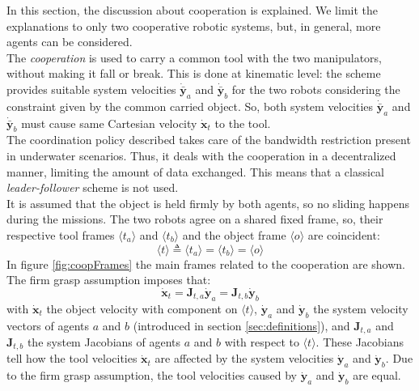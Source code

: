 In this section, the discussion about cooperation is explained. We limit the explanations to only two cooperative robotic systems, but, in general, more agents can be considered.\\
The \textit{cooperation} is used to carry a common tool with the two manipulators, without making it fall or break. This is done at kinematic level: the scheme provides suitable system velocities $\dot{\bar{\boldsymbol{y}}}_a$ and $\dot{\bar{\boldsymbol{y}}}_b$ for the two robots considering the constraint given by the common carried object. So, both system velocities $\dot{\bar{\boldsymbol{y}}}_a$ and $\dot{\bar{\boldsymbol{y}}}_b$ must cause same Cartesian velocity $\dot{{\boldsymbol{x}}}_t$ to the tool.\\
The coordination policy described takes care of the bandwidth restriction present in underwater scenarios. Thus, it deals with the cooperation in a decentralized manner, limiting the amount of data exchanged. This means that a classical \textit{leader-follower} scheme is not used.\\
It is assumed that the object is held firmly by both agents, so no sliding happens during the missions. The two robots agree on a shared fixed frame, so, their respective tool frames $\langle t_a \rangle$ and $\langle t_b \rangle$ and the object frame $\langle o \rangle$ are coincident: 
\begin{equation} 
\langle t \rangle \triangleq \langle t_a \rangle = \langle t_b \rangle = \langle o \rangle
\end{equation}
In figure \ref{fig:coopFrames} the main frames related to the cooperation are shown.\\

\noindent The firm grasp assumption imposes that:
\begin{equation}\label{eq:coopintro}
	\dot{\boldsymbol{x}}_t = \boldsymbol{J}_{t,a} \dot{\boldsymbol{y}}_a = \boldsymbol{J}_{t,b} \dot{\boldsymbol{y}}_b
\end{equation}
with $\dot{\boldsymbol{x}}_t$ the object velocity with component on $\langle t \rangle$, $\dot{\boldsymbol{y}}_a$ and $\dot{\boldsymbol{y}}_b$ the system velocity vectors of agents $a$ and $b$ (introduced in section \ref{sec:definitions}), and $\boldsymbol{J}_{t,a}$ and $\boldsymbol{J}_{t,b}$ the system Jacobians of agents $a$ and $b$ with respect to $\langle t \rangle$. These Jacobians tell how the tool velocities $\dot{\boldsymbol{x}}_t$ are affected by the system velocities $\dot{\boldsymbol{y}}_a$ and $\dot{\boldsymbol{y}}_b$. Due to the firm grasp assumption, the tool velocities caused by $\dot{\boldsymbol{y}}_a$ and $\dot{\boldsymbol{y}}_b$ are equal.\\

